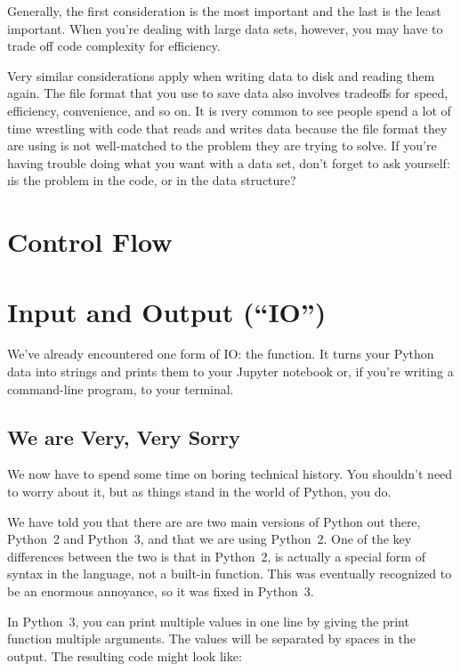 \documentclass[letterpaper, 12pt, titlepage, twoside]{article}
\begin{document}
Generally, the first consideration is the most important and the last is the
least important. When you're dealing with large data sets, however, you may
have to trade off code complexity for efficiency.

Very similar considerations apply when writing data to disk and reading them
again. The file format that you use to save data also involves tradeoffs for
speed, efficiency, convenience, and so on. It is \i{very common} to see people
spend a lot of time wrestling with code that reads and writes data because the
file format they are using is not well-matched to the problem they are trying
to solve. If you're having trouble doing what you want with a data set, don't
forget to ask yourself: \i{is the problem in the code, or in the data
  structure}?


\newpage
\section{Control Flow}


\newpage
\section{Input and Output (``IO'')}

We've already encountered one form of IO: the  function. It turns
your Python data into strings and prints them to your Jupyter notebook or, if
you're writing a command-line program, to your terminal.

\subsection*{We are Very, Very Sorry}

We now have to spend some time on boring technical history. You shouldn't need
to worry about it, but as things stand in the world of Python, you do.

We have told you that there are are two main versions of Python out there,
Python~2 and Python~3, and that we are using Python~2. One of the key
differences between the two is that in Python~2,  is actually a
special form of syntax in the language, not a built-in function. This was
eventually recognized to be an enormous annoyance, so it was fixed in
Python~3.

In Python~3, you can print multiple values in one line by giving the print
function multiple arguments. The values will be separated by spaces in the
output. The resulting code might look like:
\end{document}
